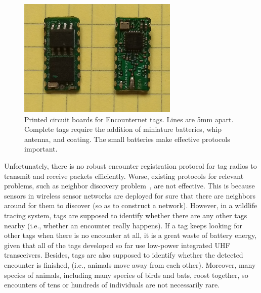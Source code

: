 \begin{figure}[!t]
    \centering
    \includegraphics[width=3in]{figures/tag}
    \caption{Printed circuit boards for Encounternet tags.%
    Lines are 5mm apart. Complete tags require the addition of miniature batteries, whip antenna, and
    coating. The small batteries make effective protocols important.}
    \label{tags}
\end{figure}

Unfortunately, there is no robust encounter registration protocol 
for tag radios to transmit and receive packets efficiently.
Worse, existing protocols for relevant problems, 
such as neighbor discovery problem~\cite{Bakht2012Searchlight}, are not effective.
This is because sensors in wireless sensor networks are deployed for sure that there 
are neighbors around for them to discover (so as to construct a network).
However, in a wildlife tracing system,
tags are supposed to identify whether there are any other tags nearby 
(i.e., whether an encounter really happens).
If a tag keeps looking for other tags when there is no encounter at all,
it is a great waste of battery energy, given that all of the tags developed so far use low-power integrated
UHF transceivers. 
Besides, tags are also supposed to identify whether the detected encounter is finished,
(i.e., animals move away from each other).
Moreover, many species of animals, including many species of
birds and bats, roost together, so encounters of tens or hundreds 
of individuals are not necessarily rare.


